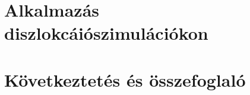 \documentclass[10pt,a4paper]{scrartcl}
\begin{document}
\section{Alkalmazás diszlokcáiószimulációkon}

\section{Következtetés és összefoglaló}
\end{document}
